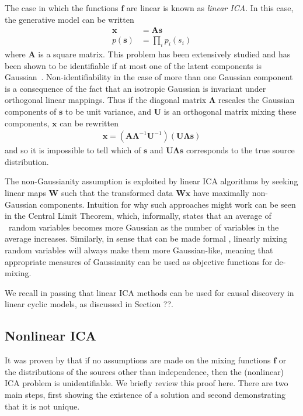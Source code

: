 The case in which the functions $\bm{f}$ are linear is known as \emph{linear ICA}. 
In this case, the generative model can be written
\begin{align*}
\bm{x} &= \bm{A}\bm{s} \\
p(\bm{s}) &= \prod_{i} p_i(s_i)
\end{align*}
where $\bm{A}$ is a square matrix.
This problem has been extensively studied and has been shown to be identifiable if at most one of the latent components is Gaussian~\citep{darmois1953analyse, skitovich1954linear, comon1994independent}.
Non-identifiability in the case of more than one Gaussian component is a consequence of the fact that an isotropic Gaussian is invariant under orthogonal linear mappings.
Thus if the diagonal matrix $\bm{\Lambda}$ rescales the Gaussian components of $\bm{s}$ to be unit variance, and $\bm{U}$ is an orthogonal matrix mixing these components, $\bm{x}$ can be rewritten
%
\begin{align*}
\bm{x} = \left(\bm{A}\bm{\Lambda}^{-1}\bm{U}^{-1} \right) \left(\bm{U}\bm{\Lambda} \bm{s}\right)
\end{align*}
%
and so it is impossible to tell which of $\bm{s}$ and $\bm{U}\bm{\Lambda} \bm{s}$ corresponds to the true source distribution. 

The non-Gaussianity assumption is exploited by linear ICA algorithms by seeking linear maps $\bm{W}$ such that the transformed data $\bm{W}\bm{x}$ have maximally non-Gaussian components.
Intuition for why such approaches might work can be seen in the Central Limit Theorem, which, informally, states that an average of \iid~random variables becomes more Gaussian as the number of variables in the average increases. 
Similarly, in sense that can be made formal \citep{hyvarinen2000independent}, linearly mixing random variables will always make them more Gaussian-like, meaning that appropriate measures of Gaussianity can be used as objective functions for de-mixing.




We recall in passing that linear ICA methods can be used for causal discovery in linear cyclic models, as discussed in Section ??.





\subsection{Nonlinear ICA}

It was proven by \cite{hyvarinen1999nonlinear} that if no assumptions are made on the mixing functions $\bm{f}$ or the distributions of the sources other than independence, then the (nonlinear) ICA problem is unidentifiable.
We briefly review this proof here. 
There are two main steps, first showing the existence of a solution and second demonstrating that it is not unique.

